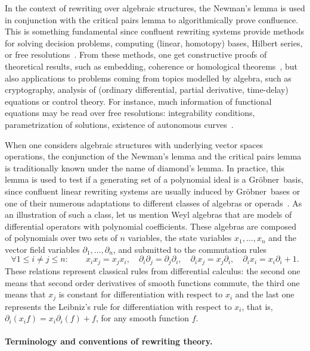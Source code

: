 \documentclass[11pt]{article}
\theoremstyle{definition}
\newcommand\G{Gröbner}
\begin{document}
In the context of rewriting over algebraic structures, the Newman's lemma
is used in conjunction with the critical pairs lemma to algorithmically
prove confluence. This is something fundamental since confluent rewriting
systems provide methods for solving decision problems, computing (linear,
homotopy) bases, Hilbert series, or free
resolutions~\cite{MR846601, MR2964639, MR1072284, MR1360005}. From these 
methods, one get constructive proofs of theoretical results, such as 
embedding, coherence or homological theorems~\cite{MR506890, MR0506423,
  MR3347996, MR3742562, MR265437, MR920522}, but also applications to 
problems coming from topics modelled by algebra, such as cryptography, 
analysis of (ordinary differential, partial derivative, time-delay) 
equations or control theory. For instance, much information of 
functional equations may be read over free resolutions: integrability
conditions, parametrization of solutions, existence of autonomous
curves~\cite{MR2233761, MR1308976}.
\medskip

When one considers algebraic structures with underlying vector spaces
operations, the conjunction of the Newman's lemma and the critical pairs lemma
is traditionally known under the name of diamond's lemma. In practice, this
lemma is used to test if a generating set of a polynomial ideal is a \G\ basis,
since confluent linear rewriting systems are usually induced by \G\ bases or one
of their numerous adaptations to different classes of algebras or
operads~\cite{MR506890, MR2202562, MR2667136, MR1044911, MR1299371}. As an
illustration of such a class, let us mention Weyl algebras that are models of
differential operators with polynomial coefficients. These algebras are composed
of polynomials over two sets of $n$ variables, the state variables
$x_1,\ldots,x_n$ and the vector field variables $\partial_1,\ldots,\partial_n$, and submitted to the
commutation rules
\[ \forall 1\leq i\neq j\leq n: \qquad x_ix_j=x_jx_i,
  \quad \partial_i\partial_j=\partial_j\partial_i, \quad \partial_ix_j=x_j\partial_i, \quad
\partial_ix_i=x_i\partial_i+1. \]
These relations represent classical rules from differential calculus: the
second one means that second order derivatives of smooth functions
commute, the third one means that $x_j$ is constant for differentiation
with respect to $x_i$ and the last one represents the Leibniz's rule for
differentiation with respect to $x_i$, that is,
$\partial_i(x_if)=x_i\partial_i(f)+f$, for any smooth function $f$.
\medskip

\paragraph{Terminology and conventions of rewriting theory.}
\end{document}
